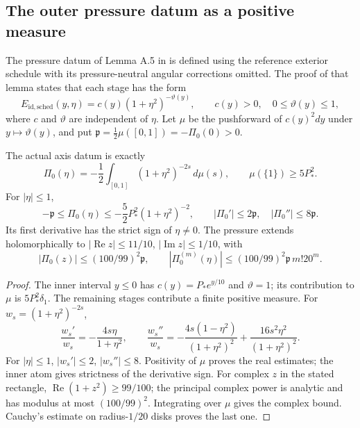 \subsection*{The outer pressure datum as a positive measure}
\label{subsec:outer-pressure-measure}
The pressure datum of Lemma A.5 in \cite{openai2026} is defined using
the reference exterior schedule with its pressure-neutral angular
corrections omitted. The proof of that lemma states that each stage
has the form
\begin{equation}\label{eq:measure-profile}
 E_{\mathrm{id,sched}}(y,\eta)
   =c(y)(1+\eta^2)^{-\vartheta(y)},\qquad
 c(y)>0,\quad0\le\vartheta(y)\le1,
\end{equation}
where $c$ and $\vartheta$ are independent of $\eta$. Let $\mu$ be the
pushforward of $c(y)^2dy$ under $y\mapsto\vartheta(y)$, and put
$\mathfrak p=\frac12\mu([0,1])=-\Pi_0(0)>0$.

\begin{proposition}
\label{prop:exact-pressure-measure}
The actual axis datum is exactly
\begin{equation}\label{eq:exact-pressure-measure}
 \Pi_0(\eta)=-\frac12\int_{[0,1]}
 (1+\eta^2)^{-2s}\,d\mu(s),\qquad
 \mu(\{1\})\ge5P_*^2.
\end{equation}
For $|\eta|\le1$,
\begin{equation}\label{eq:pressure-mass-bounds}
 -\mathfrak p\le\Pi_0(\eta)\le
 -\frac52P_*^2(1+\eta^2)^{-2},\qquad
 |\Pi_0'|\le2\mathfrak p,\quad
 |\Pi_0''|\le8\mathfrak p.
\end{equation}
Its first derivative has the strict sign of $\eta\ne0$.
The pressure extends holomorphically to
$|\operatorname{Re}z|\le11/10$,
$|\operatorname{Im}z|\le1/10$, with
\begin{equation}\label{eq:pressure-complex-bound}
 |\Pi_0(z)|\le(100/99)^2\mathfrak p,\qquad
 |\Pi_0^{(m)}(\eta)|\le(100/99)^2\mathfrak p\,m!20^m.
\end{equation}
\end{proposition}
\begin{proof}
The inner interval $y\le0$ has
$c(y)=P_*e^{y/10}$ and $\vartheta=1$; its contribution to
$\mu$ is $5P_*^2\delta_1$. The remaining stages contribute
a finite positive measure. For $w_s=(1+\eta^2)^{-2s}$,
\[
 \frac{w_s'}{w_s}=-\frac{4s\eta}{1+\eta^2},\qquad
 \frac{w_s''}{w_s}
 =-\frac{4s(1-\eta^2)}{(1+\eta^2)^2}
   +\frac{16s^2\eta^2}{(1+\eta^2)^2}.
\]
For $|\eta|\le1$, $|w_s'|\le2$,
$|w_s''|\le8$. Positivity of $\mu$ proves the real estimates;
the inner atom gives strictness of the derivative sign.
For complex $z$ in the stated rectangle,
$\operatorname{Re}(1+z^2)\ge99/100$; the principal complex
power is analytic and has modulus at most $(100/99)^2$.
Integrating over $\mu$ gives the complex bound.
Cauchy's estimate on radius-$1/20$ disks proves the last one.
\end{proof}

